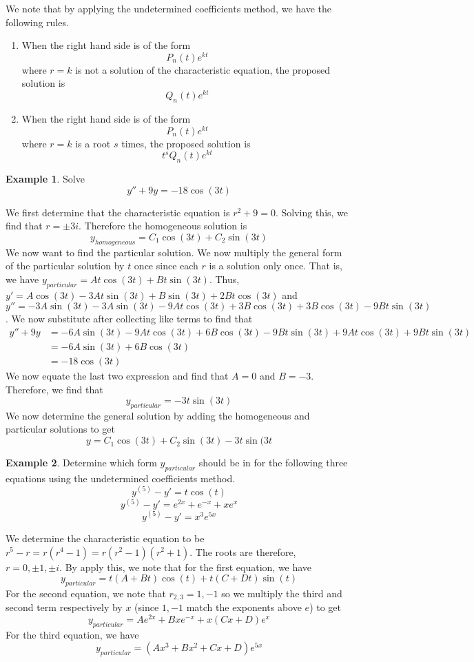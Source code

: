 \documentclass[11pt]{article}
\theoremstyle{plain} %
\theoremstyle{definition}
\theoremstyle{example}
\newtheorem*{example}{Example}
\theoremstyle{remark}
\begin{document}
We note that by applying the undetermined coefficients method, we have the following rules. 
\begin{enumerate}
	\item When the right hand side is of the form $$P_n(t)e^{kt}$$ where $r=k$ is not a solution of the characteristic equation, the proposed solution is $$Q_n(t)e^{kt}$$
	\item When the right hand side is of the form $$P_n(t)e^{kt}$$ where $r=k$ is a root $s$ times, the proposed solution is $$t^sQ_n(t)e^{kt}$$
\end{enumerate}

\begin{example}
Solve $$y'' + 9y = -18\cos(3t)$$
\end{example}

We first determine that the characteristic equation is $r^2+9=0$. Solving this, we find that $r = \pm 3i$. Therefore the homogeneous solution is $$y_{homogeneous} = C_1\cos(3t) +C_2\sin(3t)$$ We now want to find the particular solution. We now multiply the general form of the particular solution by $t$ once since each $r$ is a solution only once. That is, we have $y_{particular} = At\cos(3t) + Bt\sin(3t)$. Thus, $y' = A\cos(3t) -3At\sin(3t) + B\sin(3t) + 2Bt\cos(3t)$ and $y'' = -3A\sin(3t) -3A\sin(3t) -9At\cos(3t) + 3B\cos(3t) + 3B\cos(3t) -9Bt\sin(3t)$. We now substitute after collecting like terms to find that 
\begin{align*}
	y'' +9y &= -6A\sin(3t) -9At\cos(3t) +6B\cos(3t) - 9Bt\sin(3t) + 9At\cos(3t) + 9Bt\sin(3t)\\
	&= -6A\sin(3t) + 6B\cos(3t) \\
	&= -18\cos(3t) 
\end{align*}
We now equate the last two expression and find that $A = 0$ and $B = -3$. Therefore, we find that $$y_{particular} = -3t\sin(3t)$$ We now determine the general solution by adding the homogeneous and particular solutions to get $$y = C_1\cos(3t) + C_2\sin(3t) -3t\sin(3t$$

\begin{example}
Determine which form $y_{particular}$ should be in for the following three equations using the undetermined coefficients method.
$$y^{(5)} -y' = t\cos(t)$$
$$y^{(5)} -y' = e^{2x} + e^{-x} + xe^x$$
$$y^{(5)} -y' = x^3e^{5x}$$ 
\end{example}

We determine the characteristic equation to be $r^5-r=r\left(r^4-1\right) = r\left(r^2-1\right)\left(r^2+1\right)$. The roots are therefore, $r = 0, \pm 1, \pm i$. By apply this, we note that for the first equation, we have $$y_{particular} = t(A+Bt)\cos(t) + t(C + Dt) \sin(t)$$ For the second equation, we note that $r_{2,3} = 1, -1$ so we multiply the third and second term respectively by $x$ (since $1, -1$ match the exponents above $e$) to get $$y_{particular} = Ae^{2x} + Bxe^{-x} + x(Cx + D)e^x$$ For the third equation, we have $$y_{particular} = \left(Ax^3 + Bx^2 + Cx + D\right)e^{5x}$$
\end{document}
